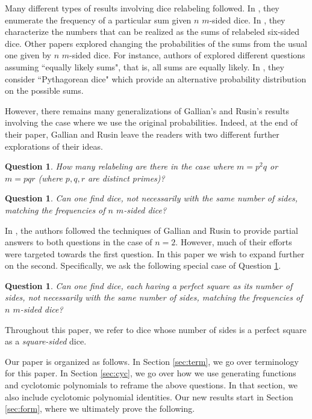 \documentclass[11pt]{amsart}
\numberwithin{equation}{section}
\theoremstyle{plain}
\newtheorem {question}[equation]{Question}
\theoremstyle{definition}
\begin{document}
Many different types of results involving dice relabeling followed. In \cite{sm}, they enumerate the frequency of a particular sum given $n$ $m$-sided dice. In \cite{fs}, they characterize the numbers that can be realized as the sums of relabeled six-sided dice. Other papers explored changing the probabilities of the sums from the usual one given by $n$ $m$-sided dice. For instance, authors of \cite{bmrs,lr,bs,m} explored different questions assuming ``equally likely sums", that is, all sums are equally likely. In \cite{rss}, they consider ``Pythagorean dice" which provide an alternative probability distribution on the possible sums. 

However, there remains many generalizations of Gallian's and Rusin's results involving the case where we use the original probabilities. Indeed, at the end of their paper, Gallian and Rusin leave the readers with two different further explorations of their ideas.
\begin{question}\label{qu:three}
How many relabeling are there in the case where $m=p^2q$ or $m=pqr$ (where $p,q,r$ are distinct primes)? 
\end{question}
\begin{question} \label{qu:dif_size}
Can one find dice, not necessarily with the same number of sides, matching the frequencies of $n$ $m$-sided dice? 
\end{question}



In \cite{firstpaper}, the authors followed the techniques of Gallian and Rusin to provide partial answers to both questions in the case of $n=2$. However, much of their efforts were targeted towards the first question. In this paper we wish to expand further on the second. Specifically, we ask the following special case of Question \ref{qu:dif_size}.

\begin{question} \label{qu:dif_size_square}
Can one find dice, each having a perfect square as its number of sides, not necessarily with the same number of sides, matching the frequencies of $n$ $m$-sided dice? 
\end{question}
\noindent Throughout this paper, we refer to dice whose number of sides is a perfect square as a \textit{square-sided} dice. 

Our paper is organized as follows. In Section \ref{sec:term}, we go over terminology for this paper. In Section \ref{sec:cyc}, we go over how we use generating functions and cyclotomic polynomials to reframe the above questions. In that section, we also include cyclotomic polynomial identities. Our new results start in Section \ref{sec:form}, where we ultimately prove the following.
\end{document}
